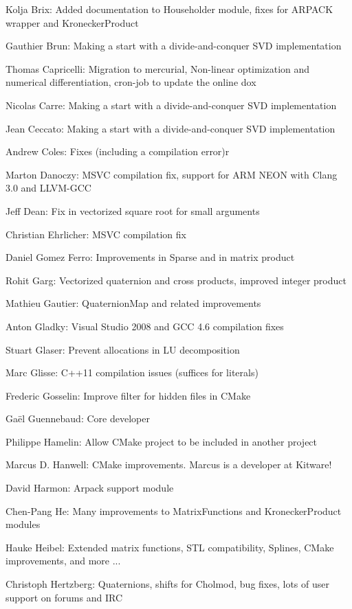 Kolja Brix:  Added documentation to Householder module, fixes for ARPACK wrapper and KroneckerProduct  

Gauthier Brun:  Making a start with a divide-and-conquer SVD implementation  

Thomas Capricelli:  Migration to mercurial, Non-linear optimization and numerical differentiation, cron-job to update the online dox 

Nicolas Carre:  Making a start with a divide-and-conquer SVD implementation  

Jean Ceccato:  Making a start with a divide-and-conquer SVD implementation  

Andrew Coles:  Fixes (including a compilation error)r  

Marton Danoczy:  MSVC compilation fix, support for ARM NEON with Clang 3.0 and LLVM-GCC  

Jeff Dean:  Fix in vectorized square root for small arguments  

Christian Ehrlicher:  MSVC compilation fix  

Daniel Gomez Ferro:  Improvements in Sparse and in matrix product  

Rohit Garg:  Vectorized quaternion and cross products, improved integer product  

Mathieu Gautier:  QuaternionMap and related improvements  

Anton Gladky:  Visual Studio 2008 and GCC 4.6 compilation fixes  

Stuart Glaser:  Prevent allocations in LU decomposition  

Marc Glisse:  C++11 compilation issues (suffices for literals)  

Frederic Gosselin:  Improve filter for hidden files in CMake  

Gaël Guennebaud:  Core developer  

Philippe Hamelin:  Allow CMake project to be included in another project  

Marcus D. Hanwell:  CMake improvements. Marcus is a developer at Kitware!  

David Harmon:  Arpack support module  

Chen-Pang He:  Many improvements to MatrixFunctions and KroneckerProduct modules  

Hauke Heibel:  Extended matrix functions, STL compatibility, Splines, CMake improvements, and more ...  

Christoph Hertzberg:  Quaternions, shifts for Cholmod, bug fixes, lots of user support on forums and IRC  

